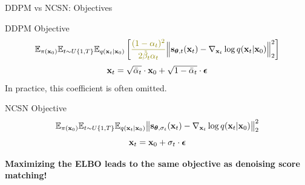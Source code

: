 \documentclass{beamer}
\begin{document}
\begin{frame}{DDPM vs NCSN: Objectives}
	\begin{block}{DDPM Objective}
		\vspace{-0.5cm}
		\[
			\bbE_{\pi(\bx_0)} \bbE_{t \sim U\{1, T\}}\bbE_{q(\bx_t | \bx_0)} \left[ {\color{olive}\frac{(1 - \alpha_t)^2}{2\tilde{\beta}_t \alpha_t}} \Bigl\|  \bs_{\btheta, t} (\bx_t) - \nabla_{\bx_t} \log q(\bx_t | \bx_0) \Bigr\|_2^2  \right]
		\]
		\[
			\mathbf{x}_t = \sqrt{\bar{\alpha}_t} \cdot \mathbf{x}_0 + \sqrt{1 - \bar{\alpha}_t} \cdot \boldsymbol{\epsilon}
		\]
		In practice, {\color{olive}this coefficient} is often omitted.
	\end{block}
	\begin{block}{NCSN Objective}
		\vspace{-0.3cm}
		\[
			\mathbb{E}_{\pi(\mathbf{x}_0)} \mathbb{E}_{t \sim U\{1, T\}} \mathbb{E}_{q(\mathbf{x}_t | \mathbf{x}_0)}\bigl\| \mathbf{s}_{\boldsymbol{\theta}, \sigma_t}(\mathbf{x}_t) - \nabla_{\mathbf{x}_t} \log q(\mathbf{x}_t | \mathbf{x}_0) \bigr\|^2_2 
		\]
		\[
			\mathbf{x}_t = \mathbf{x}_0 + \sigma_t \cdot \boldsymbol{\epsilon}
		\]
		\vspace{-0.5cm}
	\end{block}
	\textbf{Maximizing the ELBO leads to the same objective as denoising score matching!}
\end{frame}
\end{document}
